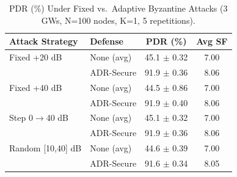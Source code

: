 \begin{table}[t]
\centering
\caption{PDR (\%) Under Fixed vs.\ Adaptive Byzantine Attacks (3 GWs, N=100 nodes, K=1, 5 repetitions).}
\label{tab:adaptive}
\begin{tabular}{llcc}
\hline
Attack Strategy & Defense & PDR (\%) & Avg SF \\
\hline
Fixed +20 dB & None (avg) & 45.1 $\pm$ 0.32 & 7.00 \\
 & ADR-Secure & 91.9 $\pm$ 0.36 & 8.06 \\
\hline
Fixed +40 dB & None (avg) & 44.5 $\pm$ 0.86 & 7.00 \\
 & ADR-Secure & 91.9 $\pm$ 0.40 & 8.06 \\
\hline
Step 0$\to$40 dB & None (avg) & 45.1 $\pm$ 0.32 & 7.00 \\
 & ADR-Secure & 91.9 $\pm$ 0.36 & 8.06 \\
\hline
Random [10,40] dB & None (avg) & 44.6 $\pm$ 0.39 & 7.00 \\
 & ADR-Secure & 91.6 $\pm$ 0.34 & 8.05 \\
\hline
\end{tabular}
\end{table}